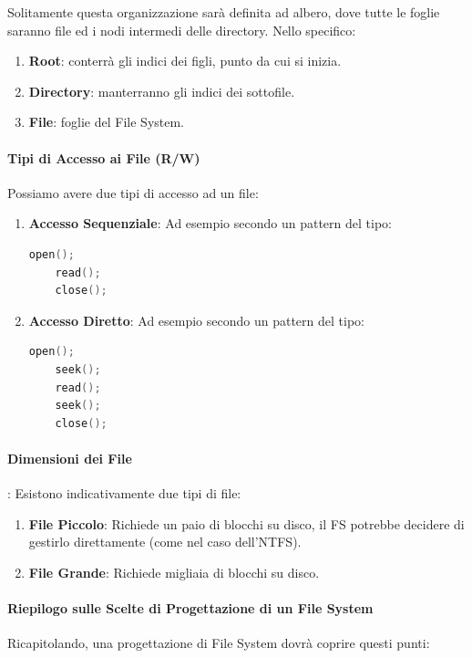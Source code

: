 \documentclass{article}
\begin{document}
Solitamente questa organizzazione sarà definita ad albero, dove tutte le foglie saranno file ed i nodi intermedi delle directory. Nello specifico:

\begin{enumerate}
    \item \textbf{Root}: conterrà gli indici dei figli, punto da cui si inizia.
    \item \textbf{Directory}: manterranno gli indici dei sottofile.
    \item \textbf{File}: foglie del File System.
\end{enumerate}

\paragraph{Tipi di Accesso ai File (R/W)} Possiamo avere due tipi di accesso ad un file:

\begin{enumerate}
\item \textbf{Accesso Sequenziale}: Ad esempio secondo un pattern del tipo:
\begin{lstlisting}[language=C]
    open();
    read();
    close();
\end{lstlisting}
\vspace*{-20px}
\item \textbf{Accesso Diretto}: Ad esempio secondo un pattern del tipo:
\begin{lstlisting}[language=C]
    open();
    seek();
    read();
    seek();
    close();
\end{lstlisting}
\end{enumerate}

\paragraph{Dimensioni dei File}: Esistono indicativamente due tipi di file:

\begin{enumerate}
    \item \textbf{File Piccolo}: Richiede un paio di blocchi su disco, il FS potrebbe decidere di gestirlo direttamente (come nel caso dell'NTFS).
    \item \textbf{File Grande}: Richiede migliaia di blocchi su disco.
\end{enumerate}

\paragraph{Riepilogo sulle Scelte di Progettazione di un File System} Ricapitolando, una progettazione di File System dovrà coprire questi punti:
\end{document}
